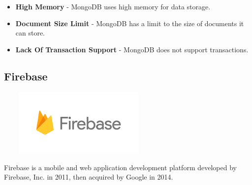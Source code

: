 \begin{itemize}
    \item \textbf{High Memory} - MongoDB uses high memory for data storage.
    \item \textbf{Document Size Limit} - MongoDB has a limit to the size of
    documents it can store.
    \item \textbf{Lack Of Transaction Support} - MongoDB does not support
    transactions.
\end{itemize}
\par
\medskip
\par
\medskip

\subsection{Firebase}
\par
\medskip
\begin{center}
    \includegraphics[width=8cm,height=3.3cm,keepaspectratio]{images/firebase}
\end{center}
Firebase is a mobile and web application development platform developed by Firebase, Inc. in 2011, then acquired by Google in 2014.